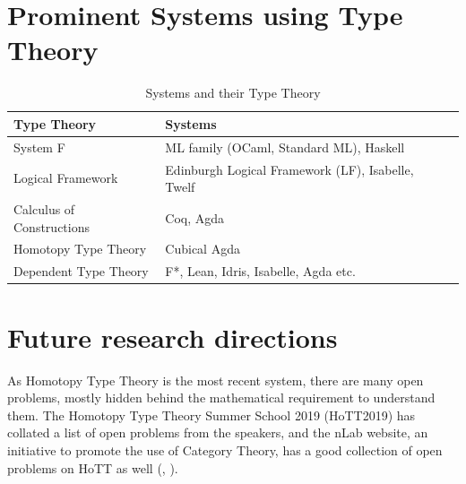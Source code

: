 \documentclass[acmsmall]{acmart}
\begin{document}
\section{Prominent Systems using Type Theory}\label{sec:application}

\begin{table}[H]
  \caption{Systems and their Type Theory}\label{tab:systems}
  \begin{tabular}{lll}
    \toprule
    Type Theory& Systems\\
    \midrule
    System F & ML family (OCaml, Standard ML), Haskell \\
    Logical Framework & Edinburgh Logical Framework (LF), Isabelle, Twelf \\
    Calculus of Constructions & Coq, Agda \footnotemark[1]\\
    Homotopy Type Theory & Cubical Agda\cite{cohen2016cubical}\\
    Dependent Type Theory & F*, Lean, Idris, Isabelle, Agda etc. \\
    \bottomrule
\end{tabular}
\end{table}

\section{Future research directions}\label{sec:future}

As Homotopy Type Theory is the most recent system, there are many open problems,
mostly hidden behind the mathematical requirement to understand them. The
Homotopy Type Theory Summer School 2019 (HoTT2019) has collated a list of open
problems from the speakers, and the nLab website, an initiative to promote the
use of Category Theory, has a good collection of open problems on HoTT as well
(\cite{hottOpenProblem}, \cite{hottOpenProblem2019}).




\end{document}
